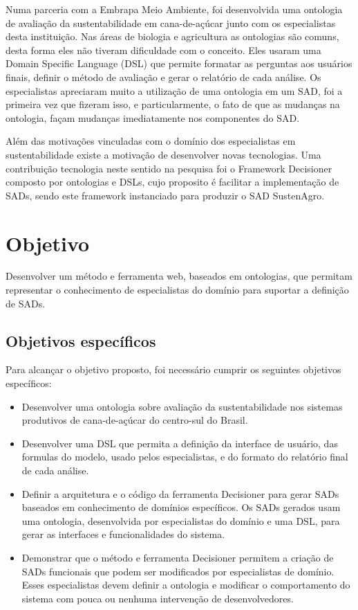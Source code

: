 Numa parceria com a Embrapa Meio Ambiente, foi desenvolvida uma ontologia
de avaliação da sustentabilidade em cana-de-açúcar junto com os especialistas
desta instituição. Nas áreas de biologia e agricultura as ontologias
são comuns, desta forma eles não tiveram dificuldade com o conceito.
Eles usaram uma \foreignlanguage{english}{Domain Specific Language}
(DSL) \citep{fowler2010domain} que permite formatar as perguntas
aos usuários finais, definir o método de avaliação e gerar o relatório
de cada análise. Os especialistas apreciaram muito a utilização de
uma ontologia em um SAD, foi a primeira vez que fizeram isso, e particularmente,
o fato de que as mudanças na ontologia, façam mudanças imediatamente
nos componentes do SAD.

Além das motivações vinculadas com o domínio dos especialistas em
sustentabilidade existe a motivação de desenvolver novas tecnologias.
Uma contribuição tecnologia neste sentido na pesquisa foi o Framework
Decisioner composto por ontologias e \foreignlanguage{english}{DSLs},
cujo proposito é facilitar a implementação de SADs, sendo este framework
instanciado para produzir o SAD SustenAgro.

\section{Objetivo}

Desenvolver um método e ferramenta web, baseados em ontologias, que
permitam representar o conhecimento de especialistas do domínio para
suportar a definição de SADs. 

\subsection*{Objetivos específicos}

Para alcançar o objetivo proposto, foi necessário cumprir os seguintes
objetivos específicos: 
\begin{itemize}
\item Desenvolver uma ontologia sobre avaliação da sustentabilidade nos
sistemas produtivos de cana-de-açúcar do centro-sul do Brasil.
\item Desenvolver uma DSL que permita a definição da interface de usuário,
das formulas do modelo, usado pelos especialistas, e do formato do
relatório final de cada análise.
\item Definir a arquitetura e o código da ferramenta Decisioner para gerar
SADs baseados em conhecimento de domínios específicos. Os SADs gerados
usam uma ontologia, desenvolvida por especialistas do domínio e uma
DSL, para gerar as interfaces e funcionalidades do sistema.
\item Demonstrar que o método e ferramenta Decisioner permitem a criação
de SADs funcionais que podem ser modificados por especialistas de
domínio. Esses especialistas devem definir a ontologia e modificar
o comportamento do sistema com pouca ou nenhuma intervenção de desenvolvedores.
\end{itemize}

